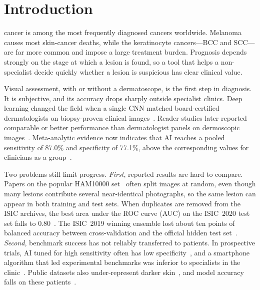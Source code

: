 \section{Introduction}
 cancer is among the most frequently diagnosed
cancers worldwide. Melanoma causes most skin-cancer deaths, while the
keratinocyte cancers---BCC and SCC---are far more common and impose a
large treatment burden. Prognosis depends strongly on the stage at
which a lesion is found, so a tool that helps a non-specialist decide
quickly whether a lesion is suspicious has clear clinical value.

Visual assessment, with or without a dermatoscope, is the first step
in diagnosis. It is subjective, and its accuracy drops sharply outside
specialist clinics. Deep learning changed the field when a single CNN
matched board-certified dermatologists on biopsy-proven clinical
images~\cite{esteva2017derm}. Reader studies later reported
comparable or better performance than dermatologist
panels on dermoscopic images~\cite{haenssle2018man,brinker2019deep,
tschandl2019comparison}. Meta-analytic evidence now indicates that AI
reaches a pooled sensitivity of 87.0\% and specificity of 77.1\%, above
the corresponding values for clinicians as a group~\cite{salinas2024}.

Two problems still limit progress. \emph{First}, reported results are
hard to compare. Papers on the popular HAM10000 set~\cite{tschandl2018ham10000}
often split images at random, even though many lesions contribute
several near-identical photographs, so the same lesion can appear in
both training and test sets. When duplicates are removed from the ISIC
archives, the best area under the ROC curve (AUC) on the ISIC~2020 test
set falls to 0.80~\cite{cassidy2022isic}. The ISIC~2019 winning ensemble
lost about ten points of balanced accuracy between cross-validation and
the official hidden test set~\cite{gessert2020}. \emph{Second},
benchmark success has not reliably transferred to patients. In
prospective trials, AI tuned for high sensitivity often has low
specificity~\cite{marchetti2023,marsden2023}, and a smartphone
algorithm that led experimental benchmarks was inferior to specialists
in the clinic~\cite{menzies2023}. Public datasets also under-represent
darker skin~\cite{wen2022}, and model accuracy falls on these
patients~\cite{daneshjou2022ddi,groh2024}.

